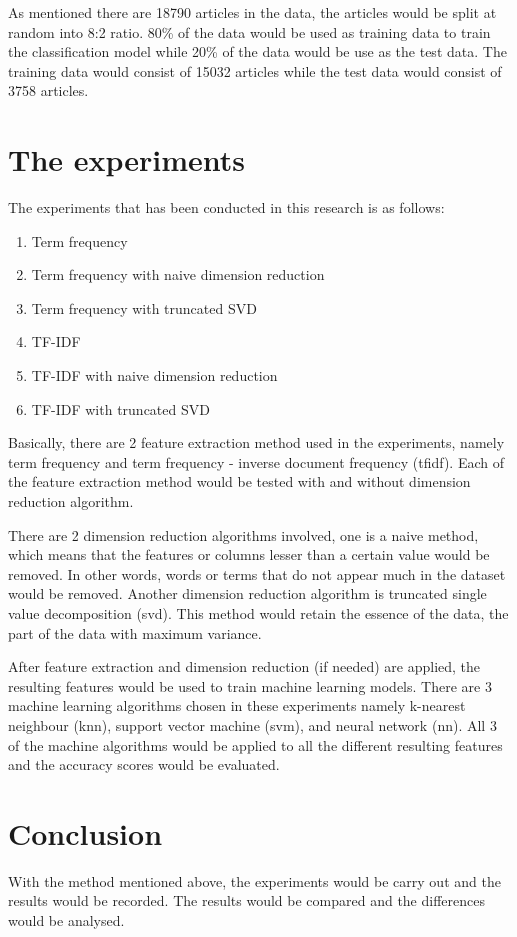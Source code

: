 As mentioned there are 18790 articles in the data, the articles would be split at random into 8:2 ratio. 80\% of the data would be used as training data to train the classification model while 20\% of the data would be use as the test data. The training data would consist of 15032 articles while the test data would consist of 3758 articles.\\


\clearpage
\section{The experiments}
The experiments that has been conducted in this research is as follows:
\begin{enumerate}
	\item Term frequency
	\item Term frequency with naive dimension reduction
	\item Term frequency with truncated SVD
	\item TF-IDF
	\item TF-IDF with naive dimension reduction
	\item TF-IDF with truncated SVD
\end{enumerate}

Basically, there are 2 feature extraction method used in the experiments, namely term frequency and term frequency - inverse document frequency (\ac{tfidf}). Each of the feature extraction method would be tested with and without dimension reduction algorithm.

There are 2 dimension reduction algorithms involved, one is a naive method, which means that the features or columns lesser than a certain value would be removed. In other words, words or terms that do not appear much in the dataset would be removed. Another dimension reduction algorithm is truncated single value decomposition (\ac{svd}). This method would retain the essence of the data, the part of the data with maximum variance. 

After feature extraction and dimension reduction (if needed) are applied, the resulting features would be used to train machine learning models. There are 3 machine learning algorithms chosen in these experiments namely k-nearest neighbour (\ac{knn}), support vector machine (\ac{svm}), and neural network (\ac{nn}). All 3 of the machine algorithms would be applied to all the different resulting features and the accuracy scores would be evaluated.


\section{Conclusion}
With the method mentioned above, the experiments would be carry out and the results would be recorded. The results would be compared and the differences would be analysed.